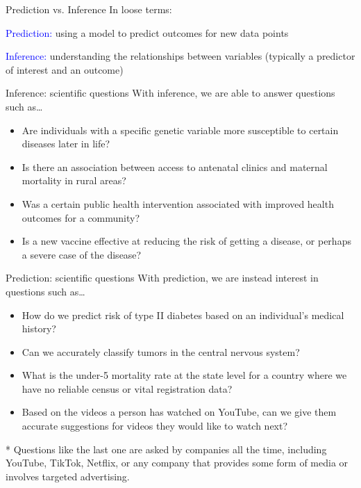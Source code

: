 \documentclass[10pt,t]{beamer}
\begin{document}
\begin{frame}{Prediction vs. Inference}
In loose terms:
\vspace{0.3cm}

\textcolor{blue}{Prediction:} using a model to predict outcomes for new data points

\vspace{0.3cm}

\textcolor{blue}{Inference:} understanding the relationships between variables (typically a predictor of interest and an outcome)
\end{frame}

\begin{frame}{Inference: scientific questions}
With inference, we are able to answer questions such as\dots

\vspace{0.3cm}

\begin{itemize}
	\item Are individuals with a specific genetic variable more susceptible to certain diseases later in life?
	\item Is there an association between access to antenatal clinics and maternal mortality in rural areas?
	\item Was a certain public health intervention associated with improved health outcomes for a community?
	\item Is a new vaccine effective at reducing the risk of getting a disease, or perhaps a severe case of the disease?
\end{itemize}

\end{frame}

\begin{frame}{Prediction: scientific questions}
With prediction, we are instead interest in questions such as\dots

\vspace{0.3cm}

\begin{itemize}
	\item How do we predict risk of type II diabetes based on an individual's medical history?
	\item Can we accurately classify tumors in the central nervous system?
	\item What is the under-5 mortality rate at the state level for a country where we have no reliable census or vital registration data?
	\item Based on the videos a person has watched on YouTube, can we give them accurate suggestions for videos they would like to watch next?
\end{itemize}

\vspace{0.3cm} \pause

* Questions like the last one are asked by companies all the time, including YouTube, TikTok, Netflix, or any company that provides some form of media or involves targeted advertising. 
\end{frame}
\end{document}
